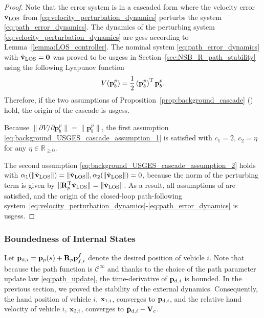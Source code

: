 \begin{proof}
    Note that the error system is in a cascaded form where the velocity error $\Tilde{\mathbf{v}}_{\rm LOS}$ from \eqref{eq:velocity_perturbation_dynamics} perturbs the system \eqref{eq:path_error_dynamics}. The dynamics of the perturbing system \eqref{eq:velocity_perturbation_dynamics} are \glspl{ges} according to Lemma~\ref{lemma:LOS_controller}. The nominal system \eqref{eq:path_error_dynamics} with $\Tilde{\mathbf{v}}_{\rm LOS}=\mathbf{0}$ was proved to be \glspl{usges} in Section~\ref{sec:NSB_R_path_stability} using the following Lyapunov function
\begin{equation}
    V(\mathbf{p}_b^p) = \frac{1}{2}\left(\mathbf{p}_b^p\right)^{\mathrm{T}}\mathbf{p}_b^p.
\end{equation}
Therefore, if the two assumptions of Proposition~\ref{prop:background_cascade} (\cite[Proposition 9]{pettersen_lyapunov_2017}) hold, the origin of the cascade is \glspl{usges}.

Because $\|\partial V/\partial \mathbf{p}_b^p\| = \|\mathbf{p}_b^p\|$, the first assumption \eqref{eq:background_USGES_cascade_assumption_1} is satisfied with $c_1 = 2, \, c_2 = \eta$ for any $\eta \in \mathbb{R}_{\geq 0}$.

The second assumption \eqref{eq:background_USGES_cascade_assumption_2} holds with $\alpha_1(\|\Tilde{\mathbf{v}}_{\rm LOS}\|) = \|\Tilde{\mathbf{v}}_{\rm LOS}\|, \alpha_2(\|\Tilde{\mathbf{v}}_{\rm LOS}\|) = 0$, because the norm of the perturbing term is given by $\|\mathbf{R}_p^{\mathrm{T}} \Tilde{\mathbf{v}}_{\rm LOS}\| = \|\Tilde{\mathbf{v}}_{\rm LOS}\|$. As a result, all assumptions of \cite[Proposition 9]{pettersen_lyapunov_2017} are satisfied, and the origin of the closed-loop path-following system~\eqref{eq:velocity_perturbation_dynamics}-\eqref{eq:path_error_dynamics} is \glspl{usges}.
\end{proof}


\subsubsection{Boundedness of Internal States}
Let $\mathbf{p}_{{\rm d}, i} = \mathbf{p}_p(s) + \mathbf{R}_p\mathbf{p}_{f, i}^f$ denote the desired position of vehicle $i$. Note that because the path function is $\mathcal{C}^{\infty}$ and thanks to the choice of the path parameter update law \eqref{eq:path_update}, the time-derivative of $\mathbf{p}_{{\rm d}, i}$ is bounded.
In the previous section, we proved the stability of the external dynamics.
Consequently, the hand position of vehicle $i$, $\mathbf{x}_{1, i}$, converges to $\mathbf{p}_{{\rm d}, i}$, and the relative hand velocity of vehicle $i$, $\mathbf{x}_{2, i}$, converges to $\dot{\mathbf{p}}_{{\rm d}, i} - \mathbf{V}_c$.


